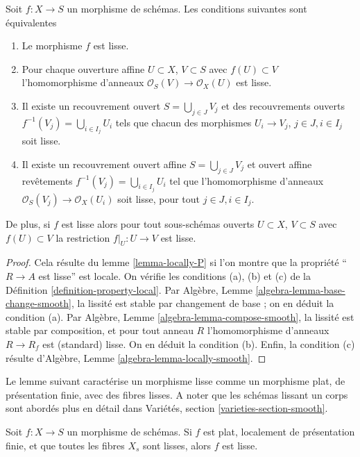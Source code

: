 \begin{lemma}
\label{lemma-smooth-characterize}
Soit $f : X \to S$ un morphisme de schémas. Les conditions
suivantes sont équivalentes
\begin{enumerate}
\item Le morphisme $f$ est lisse.
\item Pour chaque ouverture affine $U \subset X$, $V \subset S$
avec $f(U) \subset V$ l'homomorphisme
d'anneaux $\mathcal{O}_S(V) \to \mathcal{O}_X(U)$ est lisse.
\item Il existe un recouvrement ouvert $S = \bigcup_{j \in J} V_j$ et
des recouvrements ouverts $f^{-1}(V_j) = \bigcup_{i \in I_j} U_i$ tels que chacun
des morphismes $U_i \to V_j$, $j\in J, i\in I_j$ soit
lisse.
\item Il existe un recouvrement ouvert affine $S = \bigcup_{j \in J} V_j$
et ouvert affine revêtements $f^{-1}(V_j) = \bigcup_{i \in I_j} U_i$ tel que
l'homomorphisme d'anneaux $\mathcal{O}_S(V_j) \to \mathcal{O}_X(U_i)$ soit lisse,
pour tout $j\in J, i\in I_j$.
\end{enumerate}
De plus, si $f$ est lisse alors
pour tout sous-schémas ouverts $U \subset X$, $V \subset S$ avec $f(U) \subset V$
la restriction $f|_U : U \to V$ est lisse.
\end{lemma}

\begin{proof}
Cela résulte du lemme \ref{lemma-locally-P} si l'on montre que la propriété
``$R \to A$ est lisse''
est locale. On vérifie les conditions (a), (b)
et (c) de la Définition \ref{definition-property-local}.
Par Algèbre, Lemme \ref{algebra-lemma-base-change-smooth}, la lissité est stable
par changement de base ; on en déduit
la condition (a). Par
Algèbre, Lemme \ref{algebra-lemma-compose-smooth}, la lissité est stable
par composition, et pour tout anneau $R$ l'homomorphisme
d'anneaux $R \to R_f$ est (standard) lisse.
On en déduit la condition (b). Enfin, la
condition (c) résulte d'Algèbre, Lemme \ref{algebra-lemma-locally-smooth}.
\end{proof}

\noindent
Le lemme suivant caractérise un morphisme lisse comme un
morphisme plat, de présentation finie, avec des fibres
lisses. A noter que les schémas lissant un corps sont abordés plus
en détail dans Variétés, section \ref{varieties-section-smooth}.

\begin{lemma}
\label{lemma-smooth-flat-smooth-fibres}
Soit $f : X \to S$ un morphisme de schémas. Si $f$
est plat, localement de présentation finie, et que toutes les fibres
$X_s$ sont lisses, alors $f$
est lisse.
\end{lemma}

